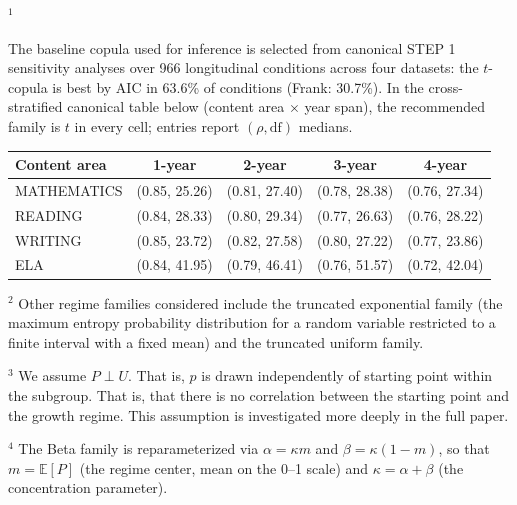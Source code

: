 \documentclass[10pt]{article}
\begin{document}
\vspace{0.60in}

\hspace{0.15in}%
$^{1}$%
\begin{minipage}[t]{15.2in}
The baseline copula used for inference is selected from canonical STEP 1 sensitivity analyses over 966 longitudinal conditions across four datasets: the $t$-copula is best by AIC in 63.6\% of conditions (Frank: 30.7\%). In the cross-stratified canonical table below (content area $\times$ year span), the recommended family is $t$ in every cell; entries report $(\rho,\mathrm{df})$ medians.
\vspace{2pt}

\begin{center}
\begin{tabular}{@{}lcccc@{}}
\textbf{Content area} & \textbf{1-year} & \textbf{2-year} & \textbf{3-year} & \textbf{4-year} \\
\hline
MATHEMATICS & (0.85, 25.26) & (0.81, 27.40) & (0.78, 28.38) & (0.76, 27.34) \\
READING     & (0.84, 28.33) & (0.80, 29.34) & (0.77, 26.63) & (0.76, 28.22) \\
WRITING     & (0.85, 23.72) & (0.82, 27.58) & (0.80, 27.22) & (0.77, 23.86) \\
ELA         & (0.84, 41.95) & (0.79, 46.41) & (0.76, 51.57) & (0.72, 42.04) \\
\end{tabular}
\end{center}
\end{minipage}

\vspace{6pt}
\hspace{0.15in}%
$^{2}$ Other regime families considered include the truncated exponential family (the maximum entropy probability distribution for a random variable restricted to a finite interval with a fixed mean) and the truncated uniform family. 

\vspace{4pt}
\hspace{0.15in}%
$^{3}$ We assume $P\perp U$. That is, $p$ is drawn independently of starting point within the subgroup. That is, that there is no correlation between the starting point and the growth regime. This assumption is investigated more deeply in the full paper.

\vspace{4pt}
\hspace{0.15in}%
$^{4}$ The Beta family is reparameterized via $\alpha = \kappa m$ and $\beta = \kappa(1-m)$, so that $m = \mathbb{E}[P]$ (the regime center, mean \SGPc on the 0--1 scale) and $\kappa = \alpha + \beta$ (the concentration parameter).
\end{document}
